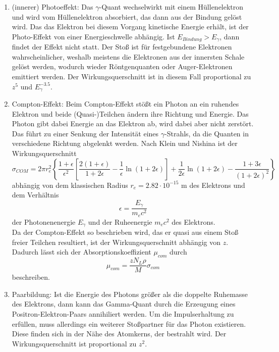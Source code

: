 \begin{enumerate}[nosep,label=\textsc{\arabic*},leftmargin=*]
\item (innerer) Photoeffekt: Das $\gamma$-Quant wechselwirkt mit einem Hüllenelektron und wird vom Hüllenelektron absorbiert, das dann aus der Bindung gelöst wird. Das das Elektron bei diesem Vorgang kinetische Energie erhält, ist der Photo-Effekt von einer Energieschwelle abhängig. Ist $E_{Bindung}>E_\gamma$, dann findet der Effekt nicht statt. Der Stoß ist für festgebundene Elektronen wahrscheinlicher, weshalb meistens die Elektronen aus der innersten Schale gelöst werden, wodurch wieder Röntgenquanten oder Auger-Elektronen emittiert werden. Der Wirkungsquerschnitt ist in diesem Fall proportional zu $z^5$ und $E_\gamma^{-3.5}$.
\item Compton-Effekt: Beim Compton-Effekt stößt ein Photon an ein ruhendes Elektron und beide (Quasi-)Teilchen ändern ihre Richtung und Energie. Das Photon gibt dabei Energie an das Elektron ab, wird dabei aber nicht zerstört. Das führt zu einer Senkung der Intensität eines $\gamma$-Strahls, da die Quanten in verschiedene Richtung abgelenkt werden. Nach Klein und Nishina ist der Wirkungsquerschnitt
\begin{equation}
  \sigma_{COM} = 2\pi r_e^2\left\{\frac{1+\epsilon}{\epsilon^2}\left[\frac{2(1+\epsilon)}{1+2\epsilon}-\frac{1}{\epsilon}\ln(1+2\epsilon)\right]+\frac{1}{2\epsilon}\ln(1+2\epsilon)-\frac{1+3\epsilon}{(1+2\epsilon)^2}\right\} 
  \label{eqlig}
\end{equation}
abhängig von dem klassischen Radius $r_e=2.82\cdot 10^{-15}$ m des Elektrons und dem Verhältnis 
\begin{equation*}
  \epsilon=\frac{E_\gamma}{m_e c^2}
\end{equation*} 
der Photonenenergie $E_\gamma$ und der Ruheenergie $m_e c^2$ des Elektrons.\\
Da der Compton-Effekt so beschrieben wird, das er quasi aus einem Stoß freier Teilchen resultiert, ist der Wirkungsquerschnitt abhängig von $z$. Dadurch lässt sich der Absorptionskoeffizient $\mu_{com}$ durch
\begin{equation}
  \mu_{com}=\frac{zN_L \rho}{M}\sigma_{com}
  \label{eqlig2}
\end{equation}
beschreiben. 
\item Paarbildung: Ist die Energie des Photons größer als die doppelte Ruhemasse des Elektrons, dann kann das Gamma-Quant durch die Erzeugung eines Positron-Elektron-Paars annihiliert werden. Um die Impulserhaltung zu erfüllen, muss allerdings ein weiterer Stoßpartner für das Photon existieren. Diese finden sich in der Nähe des Atomkerns, der bestrahlt wird. Der Wirkungsquerschnitt ist proportional zu $z^2$.
\end{enumerate}
